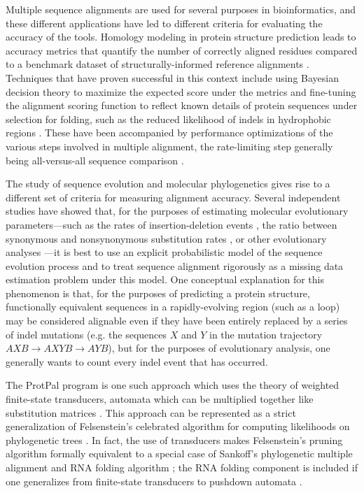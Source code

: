 \documentclass{bioinfo}
\begin{document}
Multiple sequence alignments are used for several purposes in bioinformatics,
and these different applications have led to different criteria for evaluating
the accuracy of the tools.
Homology modeling in protein structure prediction
leads to accuracy metrics that quantify the number of correctly aligned residues
compared to a benchmark dataset of structurally-informed reference alignments \citep{ThompsonEtAl2005}.
Techniques that have proven successful in this context include using Bayesian decision theory to maximize the expected
score under the metrics \citep{NotredameEtAl2000,DoEtAl2005,SchwartzPachter2007,BradleyEtAl2009}
and fine-tuning the alignment scoring function to reflect known details of
protein sequences under selection for folding, such as the reduced likelihood of indels in
hydrophobic regions \citep{KatohEtAl2005,Edgar2004b,LarkinEtAl2007}.
These have been accompanied by performance optimizations of the various steps involved in multiple alignment,
the rate-limiting step generally being all-versus-all sequence comparison \citep{BradleyEtAl2009,Edgar2004b}.

The study of sequence evolution and molecular phylogenetics gives rise to
a different set of criteria for measuring alignment accuracy.
Several independent studies have showed that, for the purposes of estimating
molecular evolutionary parameters---such as the rates of insertion-deletion events \citep{Westesson2012-zg},
the ratio between synonymous and nonsynonymous substitution rates \citep{Redelings2014},
or other evolutionary analyses \citep{LoytynojaGoldman2008}---it is best to use an explicit probabilistic model of the sequence evolution process
and to treat sequence alignment rigorously as a missing data estimation problem
under this model.
One conceptual explanation for this phenomenon is that, for the purposes of predicting a protein structure,
functionally equivalent sequences in a rapidly-evolving region (such as a loop)
may be considered alignable even if they have been entirely replaced by a series of indel mutations
(e.g. the sequences $X$ and $Y$ in the mutation trajectory $AXB \to AXYB \to AYB$),
but for the purposes of evolutionary analysis, one generally wants to count every indel event that has occurred.

The ProtPal program \citep{Westesson2012-zg} is one such approach which uses the theory of
weighted finite-state transducers,
automata which can be multiplied together like substitution matrices \cite{BouchardCote2013}.
This approach can be represented as a strict generalization of Felsenstein's celebrated
algorithm for computing likelihoods on phylogenetic trees \citep{Felsenstein81}.
In fact, the use of transducers makes Felsenstein's pruning algorithm formally
equivalent to a special case of Sankoff's phylogenetic multiple alignment and RNA folding algorithm \citep{Sankoff85};
the RNA folding component is included if one generalizes from finite-state transducers to pushdown automata \citep{BradleyHolmes2009}.
\end{document}
